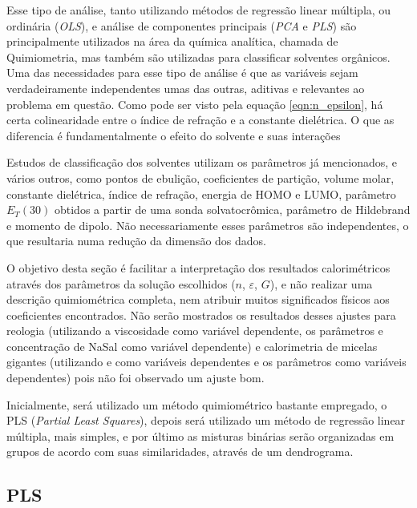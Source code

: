 		Esse tipo de análise, tanto utilizando métodos de regressão linear múltipla, ou ordinária (\emph{OLS}), e análise de componentes principais (\emph{PCA} e \emph{PLS}) são principalmente utilizados na área da química analítica, chamada de Quimiometria, mas também são utilizadas para classificar solventes orgânicos. %
		Uma das necessidades para esse tipo de análise é que as variáveis sejam verdadeiramente independentes umas das outras, aditivas e relevantes ao problema em questão. Como pode ser visto pela equação \ref{eqn:n_epsilon}, há certa colinearidade entre o índice de refração e a constante dielétrica. O que as diferencia é fundamentalmente o efeito do solvente e suas interações %
		
		Estudos de classificação dos solventes utilizam os parâmetros já mencionados, e vários outros, como pontos de ebulição, coeficientes de partição, volume molar, constante dielétrica, índice de refração, energia de HOMO e LUMO, parâmetro \(E_T(30)\) obtidos a partir de uma sonda solvatocrômica, parâmetro de Hildebrand e momento de dipolo. %
		Não necessariamente esses parâmetros são independentes, o que resultaria numa redução da dimensão dos dados.
		
		O objetivo desta seção é facilitar a interpretação dos resultados calorimétricos %
		através dos parâmetros da solução escolhidos (\(n\), \(\varepsilon\), \(G\)), e não realizar uma descrição quimiométrica completa, nem atribuir muitos significados físicos aos coeficientes encontrados. Não serão mostrados os resultados desses ajustes para reologia (utilizando a viscosidade como variável dependente, os parâmetros e concentração de NaSal como variável dependente) e calorimetria de micelas gigantes (utilizando \cwlm{} e \DHwlm{} como variáveis dependentes e os parâmetros como variáveis dependentes) pois não foi observado um ajuste bom.
		
		Inicialmente, será utilizado um método quimiométrico bastante empregado, o PLS (\emph{Partial Least Squares}), depois será utilizado um método de regressão linear múltipla, mais simples, e por último as misturas binárias serão organizadas em grupos de acordo com suas similaridades, através de um dendrograma.
		
		\subsection{PLS}
		

